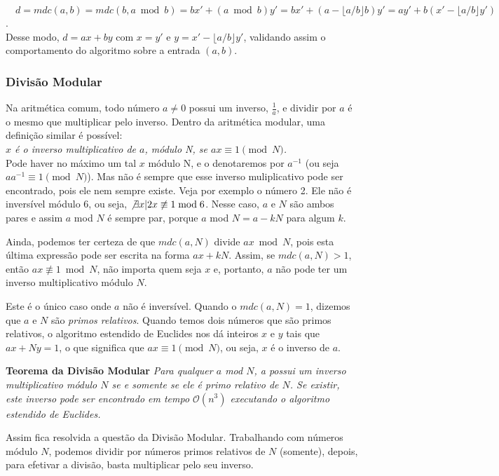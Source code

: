 $\quad d = mdc(a,b) = mdc(b, a\bmod b) = bx' + (a \bmod b)y' = bx' + (a -
\lfloor a/b \rfloor b)y' = ay' + b(x' - \lfloor a/b \rfloor y')$.\\

Desse modo, $d = ax + by$ com $x = y'$ e $y = x' - \lfloor a/b \rfloor y'$,
validando assim o comportamento do algoritmo sobre a entrada $(a,b)$.


\vspace{1.3em}
\subsubsection*{Divisão Modular}

Na aritmética comum, todo número $a \neq 0$ possui um inverso, $\frac{1}{a}$,
e dividir por $a$ é o mesmo que multiplicar pelo inverso. Dentro da aritmética
modular, uma definição similar é possível:\\

\textit{$x$ é o inverso multiplicativo de $a$, módulo N, se $ax \equiv 1 \pmod
N$.}\\

Pode haver no máximo um tal $x$ módulo N, e o denotaremos por $a^{-1}$ (ou
seja $aa^{-1} \equiv 1 \pmod N$).  Mas não é sempre que esse inverso
muliplicativo pode ser encontrado, pois ele nem sempre existe. Veja por
exemplo o número 2. Ele não é inversível módulo 6, ou seja, $\not\exists x |
2x \not\equiv 1 \bmod 6$.  Nesse caso, $a$ e $N$ são ambos pares e assim $a$
mod $N$ é sempre par, porque $a$ mod $N = a - kN$ para algum $k$.

Ainda, podemos ter certeza de que $mdc(a,N)$ divide $ax \bmod N$, pois esta
última expressão pode ser escrita na forma $ax + kN$. Assim, se $mdc(a,N) >
1$, então $ax \not\equiv 1 \bmod N$, não importa quem seja $x$ e, portanto,
$a$ não pode ter um inverso multiplicativo módulo $N$.

Este é o único caso onde $a$ não é inversível. Quando o $mdc(a,N) = 1$,
dizemos que $a$ e $N$ são \textit{primos relativos}. Quando temos dois números
que são primos relativos, o algoritmo estendido de Euclides nos dá inteiros
$x$ e $y$ tais que $ax + Ny = 1$, o que significa que $ax \equiv 1 \pmod N$,
ou seja, $x$ é o inverso de $a$.

\textbf{Teorema da Divisão Modular} \textit{Para qualquer $a$ mod $N$, a
possui um inverso multiplicativo módulo $N$ se e somente se ele é primo
relativo de $N$. Se existir, este inverso pode ser encontrado em tempo
$\mathcal{O}(n^3)$ executando o algoritmo estendido de Euclides.}

Assim fica resolvida a questão da Divisão Modular. Trabalhando com números
módulo $N$, podemos dividir por números primos relativos de $N$ (somente),
depois, para efetivar a divisão, basta multiplicar pelo seu inverso.

